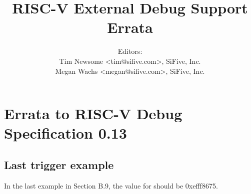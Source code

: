 \documentclass[twoside,11pt]{article}
\begin{document}
\title{RISC-V External Debug Support Errata\\
\GITHash
}
\author{Editors: \\
Tim Newsome \textless tim@sifive.com\textgreater, SiFive, Inc. \\
Megan Wachs \textless megan@sifive.com\textgreater, SiFive, Inc.}
\date{\GITAuthorDate}
\maketitle

\section{Errata to RISC-V Debug Specification 0.13}

\subsection{Last trigger example}

In the last example in Section B.9, the value for  should be
0xefff8675.
\end{document}

